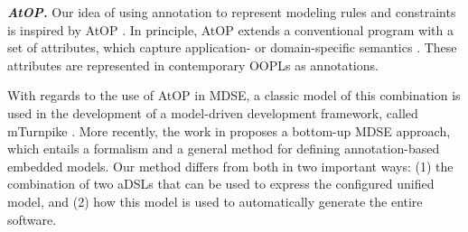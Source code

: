 \textbf{\textit{AtOP.}}
Our idea of using annotation to represent modeling rules and constraints is inspired by AtOP \cite{wada_modeling_2005, cepa_representing_2005,sulir_recording_2016,balz_embedding_2012}. In principle, AtOP extends a conventional program with a set of attributes, which capture application- or domain-specific semantics \cite{cepa_representing_2005}. These attributes are represented in contemporary OOPLs as annotations. 

With regards to the use of AtOP in MDSE, a classic model of this combination is used in the development of a model-driven development framework, called mTurnpike \cite{wada_modeling_2005}. 
%
More recently, the work in \cite{balz_embedding_2012} proposes a bottom-up MDSE approach, which entails a formalism and a general method for defining annotation-based embedded models. 
%
Our method differs from both \cite{wada_modeling_2005,balz_embedding_2012} in two important ways: 
(1) the combination of two aDSLs that can be used to express the configured unified model, and (2) how this model is used to automatically generate the entire software. 